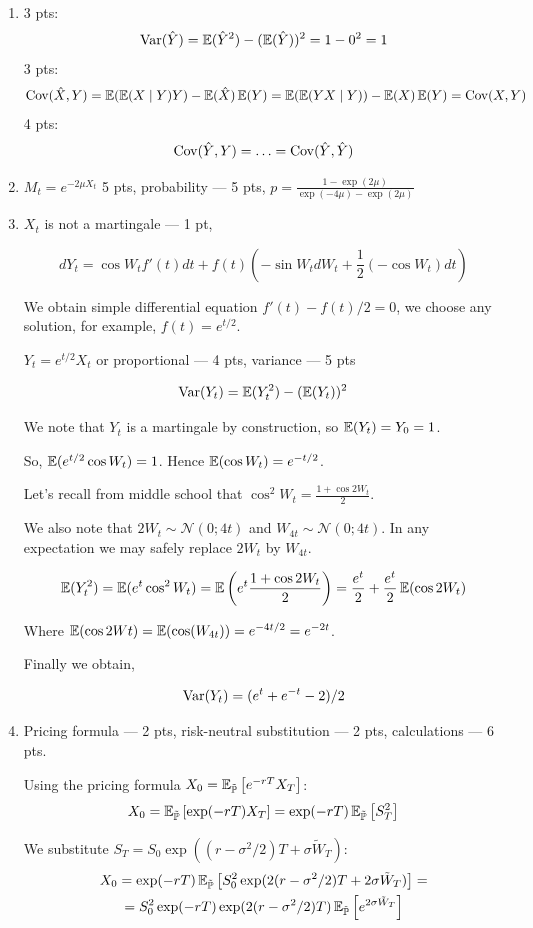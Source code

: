 \documentclass[12pt, a4paper]{article}
\newcommand{\cN}{\mathcal{N}}
\begin{document}
\begin{enumerate}
\item 3 pts:
\[
\operatorname{Var}(\hat{Y})=\operatorname{\mathbb{E}}(\hat{Y}^2)-(\operatorname{\mathbb{E}}(\hat{Y}))^2=1-0^2=1
\]
3 pts:
\[
\operatorname{Cov}(\hat{X},Y)=\operatorname{\mathbb{E}}(\operatorname{\mathbb{E}}(X \mid Y)Y)-\operatorname{\mathbb{E}}(\hat{X})\operatorname{\mathbb{E}}(Y)=\operatorname{\mathbb{E}}(\operatorname{\mathbb{E}}(YX \mid Y))-\operatorname{\mathbb{E}}(X)\operatorname{\mathbb{E}}(Y)=\operatorname{Cov}(X,Y)
\]
4 pts:
\[
\operatorname{Cov}(\hat{Y},Y)=\ldots=\operatorname{Cov}(\hat{Y},\hat{Y})
\]

\item $M_t=e^{-2\mu X_t}$ 5 pts, probability — 5 pts, $p=\frac{1-\exp(2\mu)}{\exp(-4\mu)-\exp(2\mu)}$

\item $X_t$ is not a martingale — 1 pt,

\[
dY_t = \cos W_t f'(t) dt + f(t)(-\sin W_t dW_t + \frac{1}{2}(-\cos W_t)dt)
\]

We obtain simple differential equation $f'(t)-f(t)/2=0$, we choose any solution, for example,  $f(t)=e^{t/2}$.

$Y_t=e^{t/2}X_t$ or proportional — 4 pts, variance — 5 pts

\[
\operatorname{Var}(Y_t)=\operatorname{\mathbb{E}}(Y_t^2) - (\operatorname{\mathbb{E}}(Y_t))^2
\]

We note that $Y_t$ is a martingale by construction, so $\operatorname{\mathbb{E}}(Y_t) = Y_0 = 1$.

So, $\operatorname{\mathbb{E}}(e^{t/2}\cos W_t) = 1$. Hence $\operatorname{\mathbb{E}}(\cos W_t) = e^{-t/2}$.

Let's recall from middle school that $\cos^2 W_t = \frac{1+\cos 2W_t}{2}$.

We also note that $2W_t \sim \cN(0; 4t)$ and $W_{4t} \sim \cN(0; 4t)$. In any expectation we may safely replace $2W_t$ by $W_{4t}$.

\[
\operatorname{\mathbb{E}}(Y_t^2) = \operatorname{\mathbb{E}}(e^t \cos^2 W_t) = \operatorname{\mathbb{E}}\left(e^t \frac{1+\cos 2W_t}{2}\right) = \frac{e^t}{2} + \frac{e^t}{2} \operatorname{\mathbb{E}}(\cos 2W_t)
\]

Where $\operatorname{\mathbb{E}}(\cos 2Wt) = \operatorname{\mathbb{E}}(\cos(W_{4t})) = e^{-4t/2}=e^{-2t}$.

Finally we obtain,

\[
\operatorname{Var}(Y_t)=(e^t+e^{-t}-2)/2
\]

\item Pricing formula — 2 pts, risk-neutral substitution — 2 pts, calculations — 6 pts.


Using the pricing formula $X_0=\operatorname{\mathbb{E}}_{\tilde{\operatorname{\mathbb{P}}}} \left[e^{-rT}X_T \right]$:
\[
X_0=\operatorname{\mathbb{E}}_{\tilde{\operatorname{\mathbb{P}}}} \left[\exp(-rT)X_T \right]=\exp(-rT)\operatorname{\mathbb{E}}_{\tilde{\operatorname{\mathbb{P}}}} \left[S^2_T \right]
\]

We substitute $S_T=S_0 \exp((r-\sigma^2/2)T+\sigma \tilde{W}_T)$:
\begin{multline}
X_0=\exp(-rT)\operatorname{\mathbb{E}}_{\tilde{\operatorname{\mathbb{P}}}} \left[S^2_0 \exp(2(r-\sigma^2/2)T+2 \sigma \tilde{W}_T) \right]=\\
=S_0^2 \exp(-rT)\exp(2(r-\sigma^2/2)T)\operatorname{\mathbb{E}}_{\tilde{\operatorname{\mathbb{P}}}} \left[e^{2 \sigma \tilde{W}_T} \right]
\end{multline}


\end{enumerate}
\end{document}
